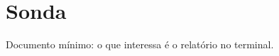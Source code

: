 \documentclass[a5paper, 12pt]{book}
\begin{document}
\chapter{Sonda}
Documento mínimo: o que interessa é o relatório no terminal.
\end{document}
